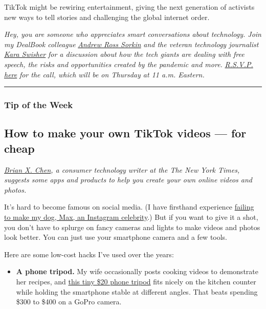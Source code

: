 TikTok might be rewiring entertainment, giving the next generation of
activists new ways to tell stories and challenging the global internet
order.

\emph{Hey, you are someone who appreciates smart conversations about
technology. Join my DealBook colleague}
\href{https://www.nytimes.com/by/andrew-ross-sorkin}{\emph{Andrew Ross
Sorkin}} \emph{and the veteran technology journalist}
\href{https://www.nytimes.com/column/kara-swisher}{\emph{Kara Swisher}}
\emph{for a discussion about how the tech giants are dealing with free
speech, the risks and opportunities created by the pandemic and more.}
\href{https://timesevents.nytimes.com/dealbookdebrief0604}{\emph{R.S.V.P.
here}} \emph{for the call, which will be on Thursday at 11 a.m.
Eastern.}

\begin{center}\rule{0.5\linewidth}{\linethickness}\end{center}

\hypertarget{tip-of-the-week}{%
\subsubsection{Tip of the Week}\label{tip-of-the-week}}

\hypertarget{how-to-make-your-own-tiktok-videos--for-cheap}{%
\subsection{How to make your own TikTok videos --- for
cheap}\label{how-to-make-your-own-tiktok-videos--for-cheap}}

\href{https://www.nytimes.com/by/brian-x-chen}{\emph{Brian X.
Chen}}\emph{, a consumer technology writer at the The New York Times,
suggests some apps and products to help you create your own online
videos and photos.}

It's hard to become famous on social media. (I have firsthand experience
\href{https://www.nytimes.com/2018/12/05/technology/personaltech/instagram-influencers-dogs-food.html}{failing
to make my dog, Max, an Instagram celebrity}.) But if you want to give
it a shot, you don't have to splurge on fancy cameras and lights to make
videos and photos look better. You can just use your smartphone camera
and a few tools.

Here are some low-cost hacks I've used over the years:

\begin{itemize}
\tightlist
\item
  \textbf{A phone tripod.} My wife occasionally posts cooking videos to
  demonstrate her recipes, and
  \href{https://www.amazon.com/UBeesize-Portable-Adjustable-Universal-Compatible/dp/B06Y2VP3C7}{this
  tiny \$20 phone tripod} fits nicely on the kitchen counter while
  holding the smartphone stable at different angles. That beats spending
  \$300 to \$400 on a GoPro camera.
\end{itemize}

